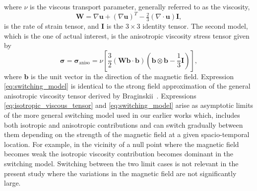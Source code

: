 \documentclass[fleqn,usenatbib]{mnras}
\newcommand{\rs}[2]{{#2}}
\newcommand{\ten}[1]{{\bm #1}}
\renewcommand{\vec}[1]{{\bm #1}}
\begin{document}
where $\nu$ is the viscous transport parameter, generally referred to as the viscosity,
\begin{equation}
  \label{eq:rate_of_strain}
  \ten{W} = \nabla\vec{u} + (\nabla\vec{u})^T - \tfrac{2}{3}(\nabla \cdot \vec{u})\ten{I},
\end{equation}
is the rate of strain tensor, and $\ten{I}$ is the  $3\times 3$
identity \rs{}{tensor. The second model, which is the one of actual interest, is the} anisotropic viscosity stress
tensor given by
\begin{equation}
  \label{eq:switching_model}
\rs{}{\ten{\sigma} = \ten{\sigma}_\text{aniso}} = \nu \left[\frac{3}{2}(\ten{W}\vec{b}\cdot\vec{b}) \left( \vec{b} \otimes \vec{b} - \frac{1}{3}\ten{I} \right)\right],
\end{equation}
where $\vec{b}$ is the unit vector in the direction of the magnetic
field.
\rs{}{
Expression \eqref{eq:switching_model} is identical to the strong field approximation of the
general anisotropic viscosity tensor derived by Braginskii~\citep{braginskiiTransportProcessesPlasma1965}.
Expressions \eqref{eq:isotropic_viscous_tensor} and \eqref{eq:switching_model} arise as asymptotic limits of the
more general switching model used in our earlier works 
\citep{mactaggartBraginskiiMagnetohydrodynamicsArbitrary2017,quinnEffectAnisotropicViscosity2020,quinnKelvinHelmholtzInstabilityCollapse2021}
which, includes both isotropic and anisotropic contributions and can
switch gradually between them depending on the strength of the
magnetic field at a given spacio-temporal location. For example, in
the vicinity of a null point where the magnetic field becomes weak the
isotropic viscosity contribution becomes dominant in the switching
model. Switching between the two limit cases is not relevant in the
present study where the variations in the magnetic field are not
significantly large.}
\end{document}
